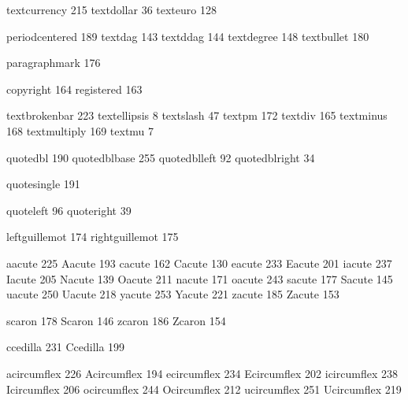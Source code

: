  textcurrency     215
 textdollar        36
 texteuro         128

 periodcentered   189
 textdag          143
 textddag         144
 textdegree       148
 textbullet       180

 paragraphmark    176

 copyright        164
 registered       163

 textbrokenbar    223
 textellipsis       8
 textslash         47
 textpm           172
 textdiv          165
 textminus        168
 textmultiply     169
 textmu             7

 quotedbl         190
 quotedblbase     255
 quotedblleft      92
 quotedblright     34

 quotesingle      191

 quoteleft         96
 quoteright        39

 leftguillemot    174
 rightguillemot   175

 aacute           225
 Aacute           193
 cacute           162
 Cacute           130
 eacute           233
 Eacute           201
 iacute           237
 Iacute           205
 Nacute           139
 Oacute           211
 nacute           171
 oacute           243
 sacute           177
 Sacute           145
 uacute           250
 Uacute           218
 yacute           253
 Yacute           221
 zacute           185
 Zacute           153

 scaron           178
 Scaron           146
 zcaron           186
 Zcaron           154

 ccedilla         231
 Ccedilla         199

 acircumflex      226
 Acircumflex      194
 ecircumflex      234
 Ecircumflex      202
 icircumflex      238
 Icircumflex      206
 ocircumflex      244
 Ocircumflex      212
 ucircumflex      251
 Ucircumflex      219

